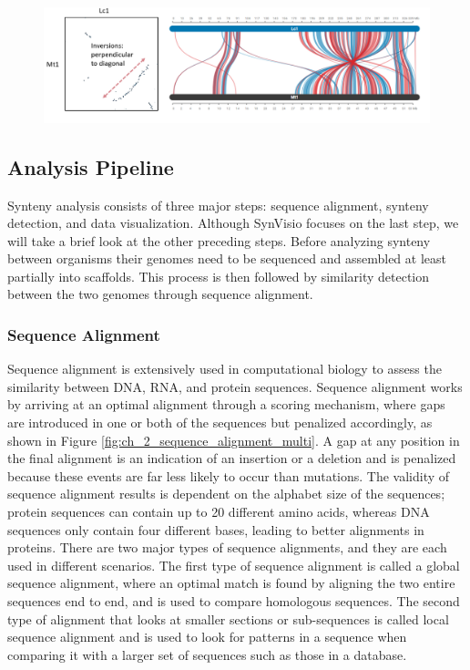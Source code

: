 \begin{figure}
  \centering
  \includegraphics[width=.99\linewidth]{images/ch_2_inversions.PNG}
  \label{fig:ch_2_inversions}
\end{figure}

\subsection{Analysis Pipeline}

Synteny analysis consists of three major steps: sequence alignment, synteny detection, and data visualization. Although SynVisio focuses on the last step, we will take a brief look at the other preceding steps. Before analyzing synteny between organisms their genomes need to be sequenced and assembled at least partially into scaffolds. This process is then followed by similarity detection between the two genomes through sequence alignment.



\subsubsection{Sequence Alignment}
Sequence alignment is extensively used in computational biology to assess the similarity between DNA, RNA, and protein sequences. Sequence alignment works by arriving at an optimal alignment through a scoring mechanism, where gaps are introduced in one or both of the sequences but penalized accordingly, as shown in Figure \ref{fig:ch_2_sequence_alignment_multi}. A gap at any position in the final alignment is an indication of an insertion or a deletion and is penalized because these events are far less likely to occur than mutations. The validity of sequence alignment results is dependent on the alphabet size of the sequences; protein sequences can contain up to 20 different amino acids, whereas DNA sequences only contain four different bases, leading to better alignments in proteins. There are two major types of sequence alignments, and they are each used in different scenarios. The first type of sequence alignment is called a global sequence alignment, where an optimal match is found by aligning the two entire sequences end to end, and is used to compare homologous sequences. The second type of alignment that looks at smaller sections or sub-sequences is called local sequence alignment and is used to look for patterns in a sequence when comparing it with a larger set of sequences such as those in a database. 


